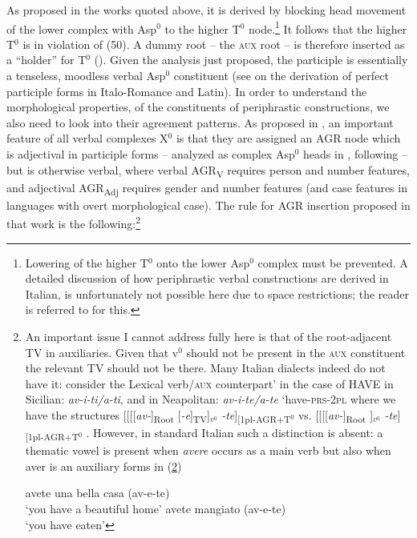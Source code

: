 \documentclass[output=paper]{langscibook}
\begin{document}
As proposed in the works quoted above, it is derived by blocking head movement of the lower complex with Asp$^0$ to the higher T$^0$ node.\footnote{Lowering of the higher T$^0$ onto the lower Asp$^0$ complex must be prevented. A detailed discussion of how periphrastic verbal constructions are derived in Italian, is unfortunately not possible here due to space restrictions; the reader is referred to \citet{calabrese2019a} for this.} It follows that the higher T$^0$ is in violation of (50).  A dummy root -- the \textsc{aux} root -- is therefore inserted as a “holder” for T$^0$ (\citealt{bjorkman2011a}). Given the analysis just proposed, the participle is essentially a tenseless, moodless verbal Asp$^0$ constituent (see \citealt{calabrese2020a} on the derivation of perfect participle forms in Italo-Romance and Latin).
In order to understand the morphological properties, of the constituents of periphrastic constructions, we also need to look into their agreement patterns.  As proposed in \citet{calabrese2019a}, an important feature of all verbal complexes X$^0$ is that they are assigned an AGR node which is adjectival in participle forms --  analyzed as complex Asp$^0$ heads in \citet{calabrese2019a}, following \citet{embick2000a, embick2004a} --  but is otherwise verbal, where verbal AGR\textsubscript{V} requires person and number features, and adjectival AGR\textsubscript{Adj} requires gender and number features (and case features in languages with overt morphological case). The rule for AGR insertion proposed in that work is the following:\footnote{An important issue I cannot address fully here is that of the root-adjacent TV in auxiliaries.  Given that v$^0$ should not be present in the \textsc{aux} constituent the relevant TV should not be there.  Many Italian dialects indeed do not have it: consider the  Lexical verb\slash \textsc{aux} counterpart’ in the case of HAVE in Sicilian: \textit{av-i-ti/a-ti}, and  in Neapolitan: \textit{av-i-te/a-te} ‘have-\textsc{prs}-\textsc{2pl} where we have the structures [[[[\textit{av-}]\textsubscript{Root} [\textit{-e}]\textsubscript{TV}]$_{v^0}$ \textit{-te}]\textsubscript{[1pl-AGR+T$^0$}  vs. [[[[\textit{av-}]\textsubscript{Root} ]$_{v^0}$ \textit{-te}]\textsubscript{[1pl-AGR+T$^0$} . However, in standard Italian such a distinction is absent: a thematic vowel is present when \textit{avere} occurs as a main verb but also when aver is an auxiliary forms in (\ref{fn38exb})

 \ea \label{fn38ex}
    \ea \label{fn38exa}avete una bella casa (av-e-te)\\
   ‘you have a beautiful home’
    \ex \label{fn38exb}avete mangiato (av-e-te)\\
   ‘you have eaten’
    \z
 \z

}
\end{document}
